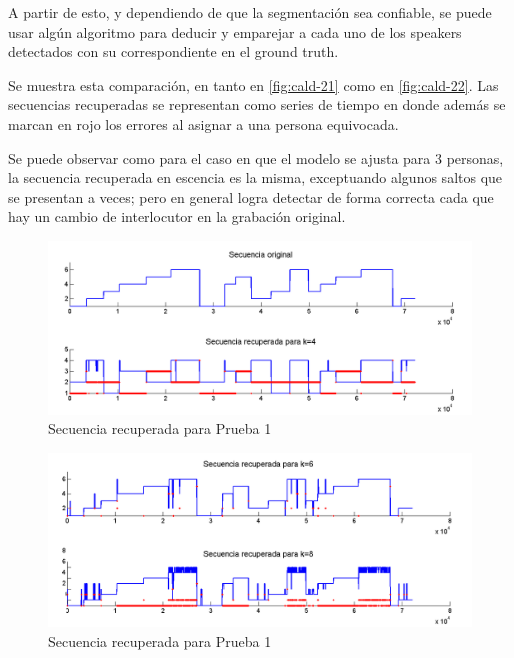 A partir de esto, y dependiendo de que la segmentación sea confiable, se puede usar algún algoritmo para deducir y emparejar a cada uno de los speakers detectados con su correspondiente en el ground truth.

Se muestra esta comparación, en tanto en \autoref{fig:cald-21} como en \autoref{fig:cald-22}. Las secuencias recuperadas se representan como series de tiempo en donde además se marcan en rojo los errores al asignar a una persona equivocada.

Se puede observar como para el caso en que el modelo se ajusta para 3 personas, la secuencia recuperada en escencia es la misma, exceptuando algunos saltos que se presentan a veces; pero en general logra detectar de forma correcta cada que hay un cambio de interlocutor en la grabación original.

\begin{figure}[bth]
  \centerline
  {\includegraphics[width=1.5\linewidth]{gfx/chap5/cuerv-21}} \quad
  \caption{Secuencia recuperada para Prueba 1}
  \label{fig:cald-21}
\end{figure}

\begin{figure}[bth]
  \centerline
  {\includegraphics[width=1.5\linewidth]{gfx/chap5/cuerv-22}} \quad
  \caption{Secuencia recuperada para Prueba 1}
  \label{fig:cald-22}
\end{figure}

